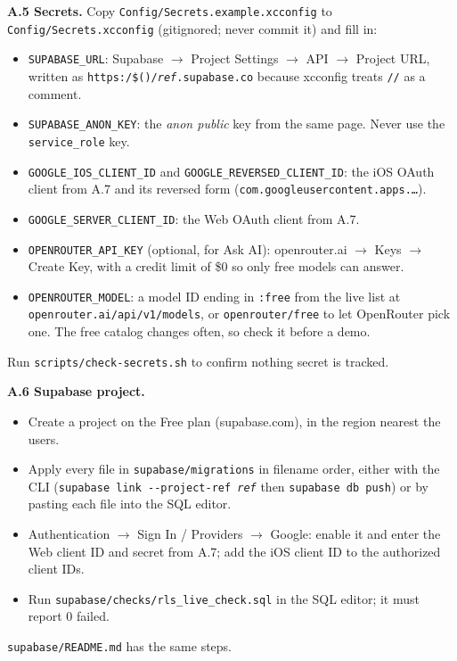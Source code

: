 \documentclass[12pt,letterpaper]{article}
\begin{document}
\textbf{A.5 Secrets.} Copy \texttt{Config/Secrets.example.xcconfig} to
\texttt{Config/Secrets.xcconfig} (gitignored; never commit it) and fill in:
\begin{itemize}
  \item \texttt{SUPABASE\_URL}: Supabase $\to$ Project Settings $\to$ API $\to$ Project
        URL, written as \texttt{https:/\$()/\textit{ref}.supabase.co} because xcconfig
        treats \texttt{//} as a comment.
  \item \texttt{SUPABASE\_ANON\_KEY}: the \emph{anon public} key from the same page.
        Never use the \texttt{service\_role} key.
  \item \texttt{GOOGLE\_IOS\_CLIENT\_ID} and \texttt{GOOGLE\_REVERSED\_CLIENT\_ID}: the
        iOS OAuth client from A.7 and its reversed form
        (\texttt{com.googleusercontent.apps.\ldots}).
  \item \texttt{GOOGLE\_SERVER\_CLIENT\_ID}: the Web OAuth client from A.7.
  \item \texttt{OPENROUTER\_API\_KEY} (optional, for Ask AI): openrouter.ai $\to$ Keys
        $\to$ Create Key, with a credit limit of \$0 so only free models can answer.
  \item \texttt{OPENROUTER\_MODEL}: a model ID ending in \texttt{:free} from the live
        list at \texttt{openrouter.ai/api/v1/models}, or \texttt{openrouter/free} to
        let OpenRouter pick one. The free catalog changes often, so check it before a
        demo.
\end{itemize}
Run \texttt{scripts/check-secrets.sh} to confirm nothing secret is tracked.

\textbf{A.6 Supabase project.}
\begin{itemize}
  \item Create a project on the Free plan (supabase.com), in the region nearest the
        users.
  \item Apply every file in \texttt{supabase/migrations} in filename order, either with
        the CLI (\texttt{supabase link -{}-project-ref \textit{ref}} then
        \texttt{supabase db push}) or by pasting each file into the SQL editor.
  \item Authentication $\to$ Sign In / Providers $\to$ Google: enable it and enter the
        Web client ID and secret from A.7; add the iOS client ID to the authorized
        client IDs.
  \item Run \texttt{supabase/checks/rls\_live\_check.sql} in the SQL editor; it must
        report 0 failed.
\end{itemize}
\texttt{supabase/README.md} has the same steps.
\end{document}
